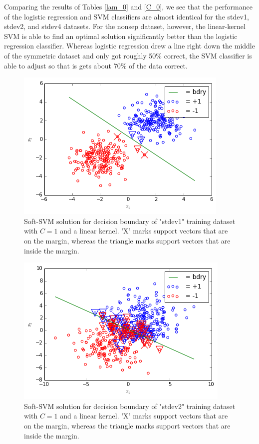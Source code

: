 \documentclass[10pt]{article}
\begin{document}
Comparing the results of Tables \ref{lam_0} and \ref{C_0}, we see that the performance of the logistic regression and SVM classifiers are almost identical for the stdev1, stdev2, and stdev4 datasets.  For the nonsep dataset, however, the linear-kernel SVM is able to find an optimal solution significantly better than the logistic regression classifier.  Whereas logistic regression drew a line right down the middle of the symmetric dataset and only got roughly 50\% correct, the SVM classifier is able to adjust so that is gets about 70\% of the data correct.

\begin{figure}
\centering
\includegraphics[scale=0.5]{svm_stdev1_train.png}
\caption{Soft-SVM solution for decision boundary of "stdev1" training dataset with $C=1$ and a linear kernel.  'X' marks support vectors that are on the margin, whereas the triangle marks support vectors that are inside the margin.}
\label{svm_stdev1}

\end{figure}
\begin{figure}
\centering
\includegraphics[scale=0.5]{svm_stdev2_train.png}
\caption{Soft-SVM solution for decision boundary of "stdev2" training dataset with $C=1$ and a linear kernel.  'X' marks support vectors that are on the margin, whereas the triangle marks support vectors that are inside the margin.}
\label{svm_stdev2}

\end{figure}
\end{document}
